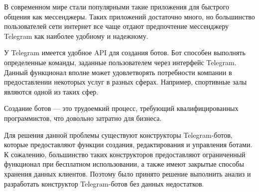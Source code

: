 
В современном мире стали популярными такие приложения для
быстрого общения как мессенджеры. Таких приложений достаточно много, но
большинство пользователей сети интернет все чаще отдают предпочтение
мессенджеру Telegram как наиболее удобному и надежному.

У Telegram имеется удобное API для создания ботов. Бот способен
выполнять определенные команды, заданные пользователем через интерфейс
Telegram. Данный функционал вполне может удовлетворять потребности
компании в предоставлении некоторых услуг в разных сферах. Например,
спортивные залы являются одной из таких сфер.

Создание ботов — это трудоемкий процесс, требующий
квалифицированных программистов, что довольно затратно для бизнеса.

Для решения данной проблемы существуют конструкторы Telegram-ботов, которые
предоставляют функции создания, редактирования и управления ботами.
К сожалению, большинство таких конструкторов предоставляют ограниченный функционал
при бесплатном использовании, а также имеют закрытые
способы хранения данных клиентов. Поэтому было принято решение выполнить анализ и
разработать конструктор Telegram-ботов без данных недостатков.



